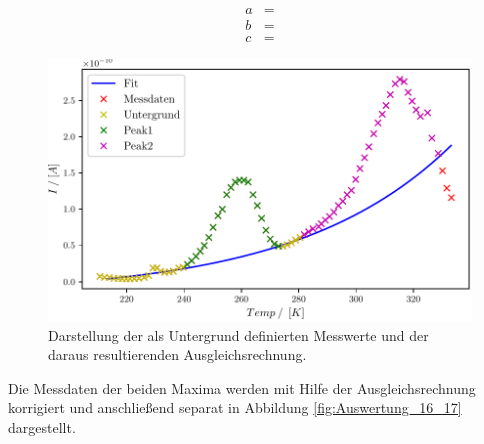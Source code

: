 \begin{align}
  a &=  \\
  b &=  \\
  c &= 
\end{align}

\begin{figure}
  \centering
  \includegraphics{build/2_Temp_current_background_peak.pdf}
  \caption{Darstellung der als Untergrund definierten Messwerte und der daraus resultierenden Ausgleichsrechnung.}
  \label{fig:Auswertung_15}
\end{figure}

Die Messdaten der beiden Maxima werden mit Hilfe der Ausgleichsrechnung korrigiert und anschließend separat in Abbildung \ref{fig:Auswertung_16_17} dargestellt.


